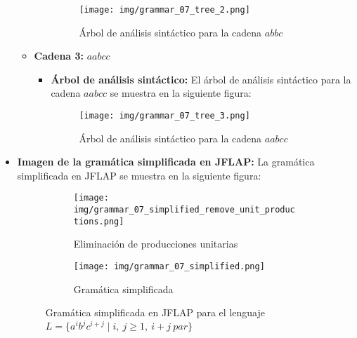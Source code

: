 \documentclass[11pt]{report}
\begin{document}
\begin{itemize}
\begin{itemize}
\begin{itemize}
      \begin{figure}[H]
        \centering
        \texttt{[image: img/grammar\_07\_tree\_2.png]}
        \caption{Árbol de análisis sintáctico para la cadena $abbc$}
        \label{fig:arbol20}
      \end{figure}
    \end{itemize}
    \item \textbf{Cadena 3:} $aabcc$
    \begin{itemize}
      \item \textbf{Árbol de análisis sintáctico:} El árbol de análisis sintáctico para la cadena $aabcc$ se muestra en la siguiente figura:
      \begin{figure}[H]
        \centering
        \texttt{[image: img/grammar\_07\_tree\_3.png]}
        \caption{Árbol de análisis sintáctico para la cadena $aabcc$}
        \label{fig:arbol21}
      \end{figure}
    \end{itemize}
  \end{itemize}
  \item \textbf{Imagen de la gramática simplificada en JFLAP:} La gramática simplificada en JFLAP se muestra en la siguiente figura:
  \begin{figure}[H]
    \begin{subfigure}{0.5\textwidth}
      \centering
      \texttt{[image: img/grammar\_07\_simplified\_remove\_unit\_productions.png]}
      \caption{Eliminación de producciones unitarias}
    \end{subfigure}%
    \begin{subfigure}{0.5\textwidth}
      \centering
      \texttt{[image: img/grammar\_07\_simplified.png]}
      \caption{Gramática simplificada}
    \end{subfigure}
    \caption{Gramática simplificada en JFLAP para el lenguaje $L = \{a^i b^j c^{i+j} \mid i, \ j \geq 1, \ i + j \ par\}$}
  \end{figure}
\end{itemize}
\end{document}
